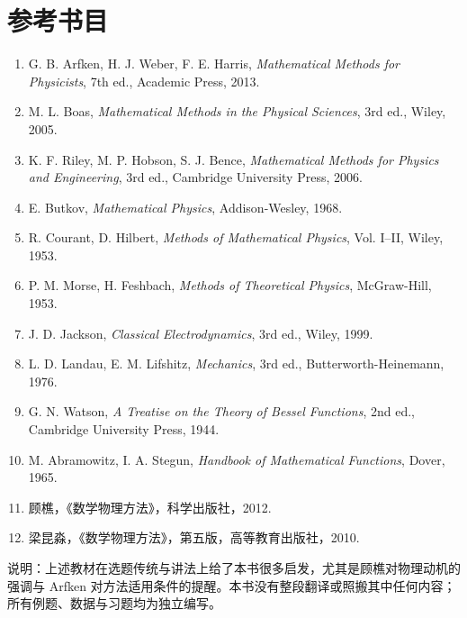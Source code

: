\chapter*{参考书目}

\begin{enumerate}[leftmargin=2.6em,itemsep=0.55em]
\item G. B. Arfken, H. J. Weber, F. E. Harris, \emph{Mathematical Methods for Physicists}, 7th ed., Academic Press, 2013.
\item M. L. Boas, \emph{Mathematical Methods in the Physical Sciences}, 3rd ed., Wiley, 2005.
\item K. F. Riley, M. P. Hobson, S. J. Bence, \emph{Mathematical Methods for Physics and Engineering}, 3rd ed., Cambridge University Press, 2006.
\item E. Butkov, \emph{Mathematical Physics}, Addison-Wesley, 1968.
\item R. Courant, D. Hilbert, \emph{Methods of Mathematical Physics}, Vol. I--II, Wiley, 1953.
\item P. M. Morse, H. Feshbach, \emph{Methods of Theoretical Physics}, McGraw-Hill, 1953.
\item J. D. Jackson, \emph{Classical Electrodynamics}, 3rd ed., Wiley, 1999.
\item L. D. Landau, E. M. Lifshitz, \emph{Mechanics}, 3rd ed., Butterworth-Heinemann, 1976.
\item G. N. Watson, \emph{A Treatise on the Theory of Bessel Functions}, 2nd ed., Cambridge University Press, 1944.
\item M. Abramowitz, I. A. Stegun, \emph{Handbook of Mathematical Functions}, Dover, 1965.
\item 顾樵，《数学物理方法》，科学出版社，2012.
\item 梁昆淼，《数学物理方法》，第五版，高等教育出版社，2010.
\end{enumerate}

\bigskip
\noindent\small 说明：上述教材在选题传统与讲法上给了本书很多启发，尤其是顾樵对物理动机的强调与 Arfken 对方法适用条件的提醒。本书没有整段翻译或照搬其中任何内容；所有例题、数据与习题均为独立编写。

